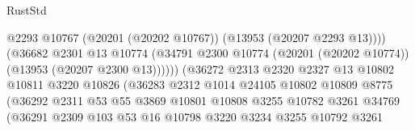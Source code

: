 \begin{lexlean}{RustStd}
\begin{coremodule}
                                              @2293
                                              @10767
                                              (@20201 (@20202 @10767))
                                              (@13953 (@20207 @2293 @13))))
                                          (@36682
                                            @2301
                                            @13
                                            @10774
                                            (@34791
                                              @2300
                                              @10774
                                              (@20201 (@20202 @10774))
                                              (@13953 (@20207 @2300 @13))))))
                                      (@36272
                                        @2313
                                        @2320
                                        @2327
                                        @13
                                        @10802
                                        @10811
                                        @3220
                                        @10826
                                        (@36283
                                          @2312
                                          @1014
                                          @24105
                                          @10802
                                          @10809
                                          @8775
                                          (@36292
                                            @2311
                                            @53
                                            @55
                                            @3869
                                            @10801
                                            @10808
                                            @3255
                                            @10782
                                            @3261
                                            @34769
                                            (@36291
                                              @2309
                                              @103
                                              @53
                                              @16
                                              @10798
                                              @3220
                                              @3234
                                              @3255
                                              @10792
                                              @3261

\end{coremodule}
\end{lexlean}
